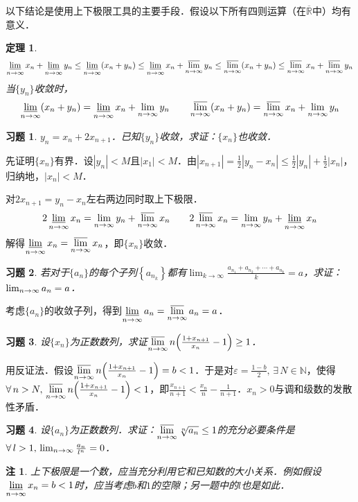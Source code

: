 \documentclass[11pt,a4paper]{ctexart}
\makeatletter
\theoremstyle{thmseries} %
\newtheorem{thm}{定理}[section]
\theoremstyle{exerseries}
\newtheorem{exer}{习题}[section]
\newtheorem*{rem}{注}
\renewenvironment{proof}[1][\proofname]{\par
  \pushQED{\qed}%
  \normalfont \topsep6\p@\@plus6\p@\relax
  \trivlist
  \item[\hskip\labelsep
        \itshape
    #1\@addpunct{}]\ignorespaces
}{%
  \popQED\endtrivlist\@endpefalse
}
\newenvironment{pf}{\begin{proof}[\bfseries\upshape 证\quad]}{\end{proof}}
\newcommand{\bra}[1]{\mathopen{}\left(#1\right)}
\newcommand{\cbra}[1]{\mathopen{}\left\{#1\right\}}
\renewcommand{\epsilon}{\varepsilon}
\newcommand{\R}{\mathbb{R}}
\newcommand{\N}{\mathbb{N}}
\def \nti {\mathnormal{n}\to\infty}
\DeclareMathOperator{\llim}{\underset{\nti}{\underline{\lim}}}
\DeclareMathOperator{\ulim}{\underset{\nti}{\overline{\lim}}}
\makeatother
\begin{document}
以下结论是使用上下极限工具的主要手段．假设以下所有四则运算（在$\overline{\R}$中）均有意义．
\begin{thm}
	\[\llim x_n+\llim y_n\leq\llim\bra{x_n+y_n}\leq\llim x_n+\ulim y_n\leq\ulim\bra{x_n+y_n}\leq\ulim x_n+\ulim y_n\]
	当$\{y_n\}$收敛时，
	\[\llim\bra{x_n+y_n}=\llim x_n+\lim_{\nti} y_n\qquad\ulim\bra{x_n+y_n}=\ulim x_n+\lim_{\nti} y_n\]
\end{thm}

\begin{exer}
	$y_n=x_n+2x_{n+1}$．已知$\{y_n\}$收敛，求证：$\{x_n\}$也收敛．
\end{exer}
\begin{pf}
	先证明$\{x_n\}$有界．设$|y_n|<M$且$|x_1|<M$．由$|x_{n+1}|=\frac{1}{2}|y_n-x_n|\leq\frac{1}{2}|y_n|+\frac{1}{2}|x_n|$，归纳地，$|x_n|<M$．

	对$2x_{n+1}=y_n-x_n$左右两边同时取上下极限．
	\[2\llim x_n=\lim_{\nti}y_n+\ulim x_n\qquad2\ulim x_n=\lim_{\nti}y_n+\llim x_n\]
	解得$\llim x_n=\ulim x_n$，即$\{x_n\}$收敛．
\end{pf}

\begin{exer}
	若对于$\{a_n\}$的每个子列$\cbra{a_{n_k}}$都有$\lim_{k\to\infty}\frac{a_{n_1}+a_{n_2}+\cdots+a_{n_k}}{k}=a$，求证：$\lim_{\nti}a_n=a$．
\end{exer}
\begin{pf}
	考虑$\{a_n\}$的收敛子列，得到$\llim a_n=\ulim a_n=a$．
\end{pf}

\begin{exer}
	设$\{x_n\}$为正数数列，求证$\ulim n\bra{\frac{1+x_{n+1}}{x_n}-1}\geq1$．
\end{exer}
\begin{pf}
	用反证法．假设$\ulim n\bra{\frac{1+x_{n+1}}{x_n}-1}=b<1$．于是对$\epsilon=\frac{1-b}{2},\,\exists\,N\in\N$，使得$\forall\,n>N,\,\ulim n\bra{\frac{1+x_{n+1}}{x_n}-1}<1$，即$\frac{x_{n+1}}{n+1}<\frac{x_n}{n}-\frac{1}{n+1}$．$x_n>0$与调和级数的发散性矛盾．
\end{pf}

\begin{exer}
	设$\{a_n\}$为正数数列．求证：$\ulim \sqrt[n]{a_n}\leq1$的充分必要条件是$\forall\,l>1,\,\lim_{\nti}\frac{a_n}{l^n}=0$．
\end{exer}
\begin{rem}
	上下极限是一个数，应当充分利用它和已知数的大小关系．例如假设$\llim x_n=b<1$时，应当考虑$b$和$1$的空隙；另一题中的$l$也是如此．
\end{rem}
\end{document}
